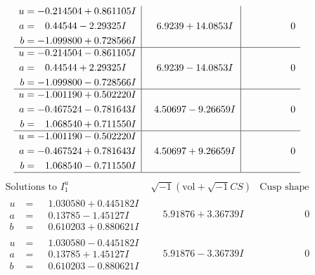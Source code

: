 \documentclass[1p]{elsarticle_modified}
\theoremstyle{definition}
\newcommand{\I}{\sqrt{-1}}
\begin{document}
$$\begin{array}{c|c|c}
\begin{aligned}
u &= -0.214504 + 0.861105 I \\
a &= \phantom{-}0.44544 - 2.29325 I \\
b &= -1.099800 + 0.728566 I\end{aligned}
 & \phantom{-}6.9239 + 14.0853 I & \phantom{-0.000000 } 0 \\ \hline\begin{aligned}
u &= -0.214504 - 0.861105 I \\
a &= \phantom{-}0.44544 + 2.29325 I \\
b &= -1.099800 - 0.728566 I\end{aligned}
 & \phantom{-}6.9239 - 14.0853 I & \phantom{-0.000000 } 0 \\ \hline\begin{aligned}
u &= -1.001190 + 0.502220 I \\
a &= -0.467524 - 0.781643 I \\
b &= \phantom{-}1.068540 + 0.711550 I\end{aligned}
 & \phantom{-}4.50697 - 9.26659 I & \phantom{-0.000000 } 0 \\ \hline\begin{aligned}
u &= -1.001190 - 0.502220 I \\
a &= -0.467524 + 0.781643 I \\
b &= \phantom{-}1.068540 - 0.711550 I\end{aligned}
 & \phantom{-}4.50697 + 9.26659 I & \phantom{-0.000000 } 0\\
 \hline 
 \end{array}$$\newpage$$\begin{array}{c|c|c}  
\text{Solutions to }I^u_{1}& \I (\text{vol} + \sqrt{-1}CS) & \text{Cusp shape}\\
 \hline 
\begin{aligned}
u &= \phantom{-}1.030580 + 0.445182 I \\
a &= \phantom{-}0.13785 - 1.45127 I \\
b &= \phantom{-}0.610203 + 0.880621 I\end{aligned}
 & \phantom{-}5.91876 + 3.36739 I & \phantom{-0.000000 } 0 \\ \hline\begin{aligned}
u &= \phantom{-}1.030580 - 0.445182 I \\
a &= \phantom{-}0.13785 + 1.45127 I \\
b &= \phantom{-}0.610203 - 0.880621 I\end{aligned}
 & \phantom{-}5.91876 - 3.36739 I & \phantom{-0.000000 } 0 \\ \hline\begin{aligned}

\end{aligned}
\end{array}$$
\end{document}
